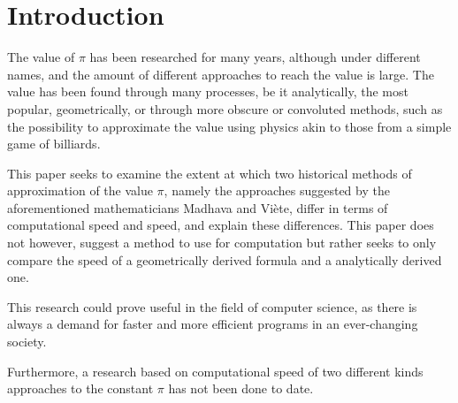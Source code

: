 \section{Introduction}


The value of $\pi$ has been researched for many years, although under different names,
and the amount of different approaches to reach the value is large. The value has been 
found through many processes, be it analytically, the most popular, geometrically, or through 
more obscure or convoluted methods, such as the possibility to approximate the value using 
physics akin to those from a simple game of billiards. \cite{galperin_2003}

This paper seeks to examine the extent at which two historical methods of
approximation of the value $\pi$, namely the approaches suggested by the aforementioned 
mathematicians Madhava and Viète, differ in terms of computational speed and 
speed, and explain these differences. This paper does not however, 
suggest a method to use for computation but rather seeks to only compare 
the speed of a geometrically derived formula and a analytically derived one. 

This research could prove useful in the field of computer science, as 
there is always a demand for faster and more efficient programs in an
ever-changing society.

Furthermore, a research based on computational speed of two different 
kinds approaches to the constant $\pi$ has not been done to date.  